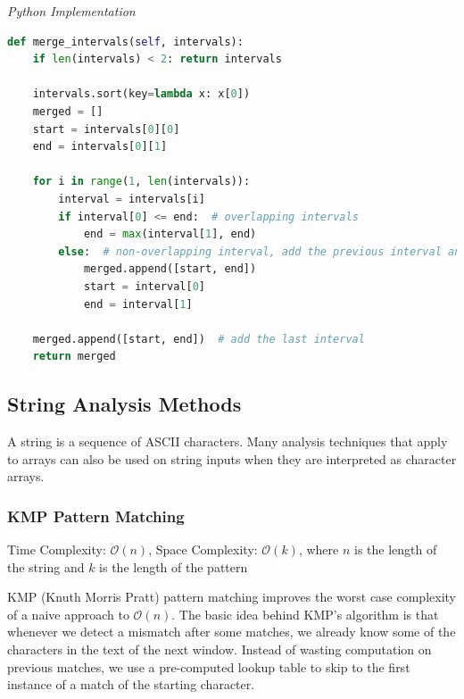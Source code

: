 \documentclass{article}
\newcommand{\bigO}{\mathcal{O}}
\begin{document}
\vspace{8pt} \emph{Python Implementation}
\begin{lstlisting}[language=Python]
def merge_intervals(self, intervals):
    if len(intervals) < 2: return intervals

    intervals.sort(key=lambda x: x[0])
    merged = []
    start = intervals[0][0]
    end = intervals[0][1]

    for i in range(1, len(intervals)):
        interval = intervals[i]
        if interval[0] <= end:  # overlapping intervals
            end = max(interval[1], end)
        else:  # non-overlapping interval, add the previous interval and reset
            merged.append([start, end])
            start = interval[0]
            end = interval[1]

    merged.append([start, end])  # add the last interval
    return merged
\end{lstlisting}
    
    
    \subsection{String Analysis Methods}
    A string is a sequence of ASCII characters. Many analysis techniques that apply to arrays can also be used on string inputs when they are interpreted as character arrays.
    
    \subsubsection{KMP Pattern Matching}
    Time Complexity: $\bigO(n)$, Space Complexity: $\bigO(k)$, where $n$ is the length of the string and $k$ is the length of the pattern
    
    KMP (Knuth Morris Pratt) pattern matching improves the worst case complexity of a naive approach to $\bigO(n)$. The basic idea behind KMP’s algorithm is that whenever we detect a mismatch after some matches, we already know some of the characters in the text of the next window. Instead of wasting computation on previous matches, we use a pre-computed lookup table to skip to the first instance of a match of the starting character.
    
\end{document}

